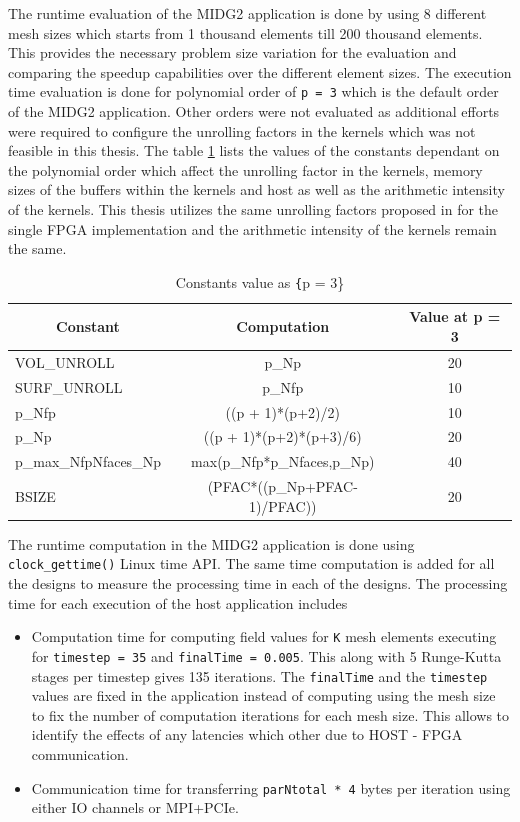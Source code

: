 The runtime evaluation of the MIDG2 application is done by using
8 different mesh sizes which starts from 1 thousand elements till
200 thousand elements. This provides the necessary problem size
variation for the evaluation and comparing the speedup capabilities
over the different element sizes. The execution time evaluation
is done for polynomial order of \texttt{p = 3} which is the default
order of the MIDG2 application. Other orders were not evaluated as
additional efforts were required to configure the unrolling factors
in the kernels which was not feasible in this thesis. The table
\ref{tab:constants} lists the values of the constants dependant
on the polynomial order which affect the unrolling factor in the
kernels, memory sizes of the buffers within the kernels and
host as well as the arithmetic intensity of the kernels.
This thesis utilizes the same unrolling factors proposed in
\cite{kenter_opencl-based_2018} for the single FPGA implementation
and the arithmetic intensity of the kernels remain the same.

\begin{table}[ht]
    \centering
    \caption{Constants value as \texttt\{p = 3\}}
    \label{tab:constants}
    \begin{tabular}{lcc}
    \multicolumn{1}{c}{\textbf{Constant}} & \multicolumn{1}{c}{\textbf{Computation}} & \multicolumn{1}{c}{\textbf{Value at p = 3}} \\
    \hline
    VOL\_UNROLL & p\_Np & 20 \\
    SURF\_UNROLL & p\_Nfp & 10\\
    p\_Nfp & ((p + 1)*(p+2)/2) & 10 \\
    p\_Np & ((p + 1)*(p+2)*(p+3)/6) & 20 \\
    p\_max\_NfpNfaces\_Np & max(p\_Nfp*p\_Nfaces,p\_Np) & 40 \\
    BSIZE & (PFAC*((p\_Np+PFAC-1)/PFAC)) & 20 \\
    \hline
    \end{tabular}%
\end{table}

The runtime computation in the MIDG2 application is done using \texttt{clock\_gettime()}
Linux time API. The same time computation is added for all the designs to
measure the processing time in each of the designs. The processing time
for each execution of the host application includes
\begin{itemize}
\item Computation time for computing field values for \texttt{K} mesh elements
executing for \texttt{timestep = 35} and \texttt{finalTime = 0.005}. This along
with 5 Runge-Kutta stages per timestep gives 135 iterations. The \texttt{finalTime}
and the \texttt{timestep} values are fixed in the application instead of
computing using the mesh size to fix the number of computation iterations for each
mesh size. This allows to identify the effects of any latencies which other
due to HOST - FPGA communication.
\item Communication time for transferring \texttt{parNtotal * 4} bytes per iteration
using either IO channels or MPI+PCIe.
\end{itemize}

